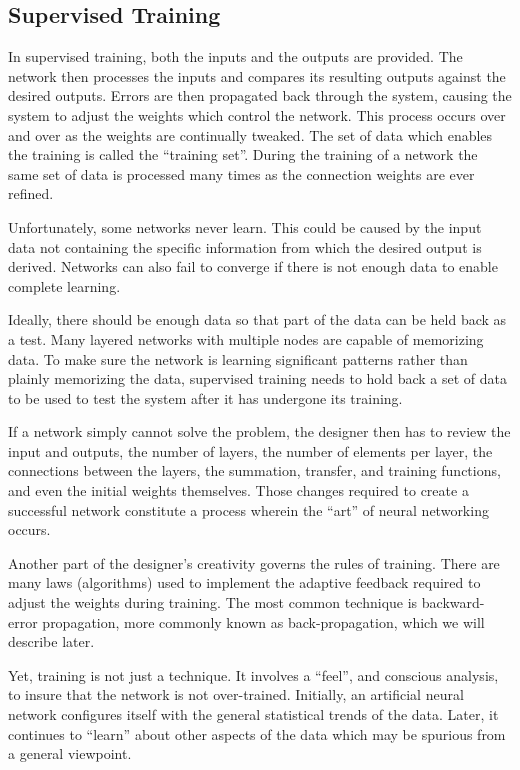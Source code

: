 \vspace{10pt}

\subsection*{Supervised Training}

In supervised training, both the inputs and the outputs are provided. The network then processes the inputs and compares its resulting outputs against the desired outputs. Errors are then propagated back through the system, causing the system to adjust the weights which control the network. This process occurs over and over as the weights are continually tweaked. The set of data which enables the training is called the ``training set''. During the training of a network the same set of data is processed many times as the connection weights are ever refined.

Unfortunately, some networks never learn. This could be caused by the input data not containing the specific information from which the desired output is derived. Networks can also fail to converge if there is not enough data to enable complete learning. 

Ideally, there should be enough data so that part of the data can be held back as a test. Many layered networks with multiple nodes are capable of memorizing data. To make sure the network is learning significant patterns rather than plainly memorizing the data, supervised training needs to hold back a set of data to be used to test the system after it has undergone its training.

If a network simply cannot solve the problem, the designer then has to review the input and outputs, the number of layers, the number of elements per layer, the connections between the layers, the summation, transfer, and training functions, and even the initial weights themselves. Those changes required to create a successful network constitute a process wherein the ``art'' of neural networking occurs.

Another part of the designer's creativity governs the rules of training. There are many laws (algorithms) used to implement the adaptive feedback required to adjust the weights during training. The most common technique is backward-error propagation, more commonly known as back-propagation, which we will describe later.

Yet, training is not just a technique. It involves a ``feel'', and conscious analysis, to insure that the network is not over-trained. Initially, an artificial neural network configures itself with the general statistical trends of the data. Later, it continues to ``learn'' about other aspects of the data which may be spurious from a general viewpoint.

